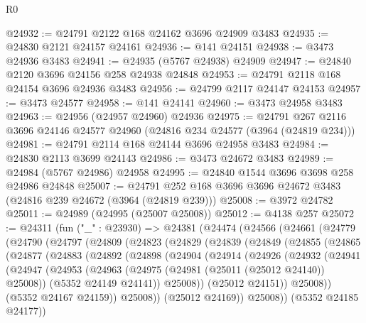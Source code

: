 \begin{lexlean}{R0}
\begin{coremodule}
@24932 := @24791 @2122 @168 @24162 @3696 @24909 @3483
@24935 := @24830 @2121 @24157 @24161
@24936 := @141 @24151
@24938 := @3473 @24936 @3483
@24941 := @24935 (@5767 @24938) @24909
@24947 := @24840 @2120 @3696 @24156 @258 @24938 @24848
@24953 := @24791 @2118 @168 @24154 @3696 @24936 @3483
@24956 := @24799 @2117 @24147 @24153
@24957 := @3473 @24577
@24958 := @141 @24141
@24960 := @3473 @24958 @3483
@24963 := @24956 (@24957 @24960) @24936
@24975 := @24791 @267 @2116 @3696 @24146 @24577 @24960 (@24816 @234 @24577 (@3964 (@24819 @234)))
@24981 := @24791 @2114 @168 @24144 @3696 @24958 @3483
@24984 := @24830 @2113 @3699 @24143
@24986 := @3473 @24672 @3483
@24989 := @24984 (@5767 @24986) @24958
@24995 := @24840 @1544 @3696 @3698 @258 @24986 @24848
@25007 := @24791 @252 @168 @3696 @3696 @24672 @3483 (@24816 @239 @24672 (@3964 (@24819 @239)))
@25008 := @3972 @24782
@25011 := @24989 (@24995 (@25007 @25008))
@25012 := @4138 @257
@25072 := @24311
    (fun ("_" : @23930) =>
    @24381
      (@24474
        (@24566
          (@24661
            (@24779
              (@24790
                (@24797
                  (@24809
                    (@24823
                      (@24829
                        (@24839
                          (@24849
                            (@24855
                              (@24865
                                (@24877
                                  (@24883
                                    (@24892
                                      (@24898
                                        (@24904
                                          (@24914
                                            (@24926
                                              (@24932
                                                (@24941
                                                  (@24947
                                                    (@24953
                                                      (@24963
                                                        (@24975
                                                          (@24981 (@25011 (@25012 @24140)) @25008))
                                                        (@5352 @24149 @24141))
                                                      @25008))
                                                  (@25012 @24151))
                                                @25008))
                                            (@5352 @24167 @24159))
                                          @25008))
                                      (@25012 @24169))
                                    @25008))
                                (@5352 @24185 @24177))

\end{coremodule}
\end{lexlean}

